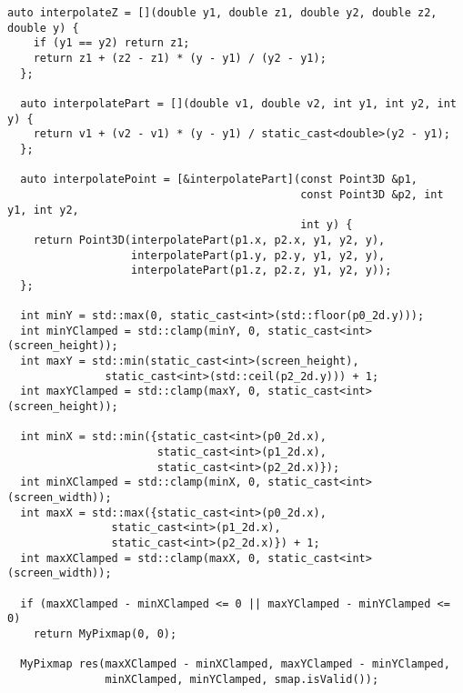 \begin{lstlisting}[caption={Продолжение Растеризация треугольника}, label={lst:render_triangle1}]
  auto interpolateZ = [](double y1, double z1, double y2, double z2, double y) {
    if (y1 == y2) return z1;
    return z1 + (z2 - z1) * (y - y1) / (y2 - y1);
  };

  auto interpolatePart = [](double v1, double v2, int y1, int y2, int y) {
    return v1 + (v2 - v1) * (y - y1) / static_cast<double>(y2 - y1);
  };

  auto interpolatePoint = [&interpolatePart](const Point3D &p1,
                                             const Point3D &p2, int y1, int y2,
                                             int y) {
    return Point3D(interpolatePart(p1.x, p2.x, y1, y2, y),
                   interpolatePart(p1.y, p2.y, y1, y2, y),
                   interpolatePart(p1.z, p2.z, y1, y2, y));
  };

  int minY = std::max(0, static_cast<int>(std::floor(p0_2d.y)));
  int minYClamped = std::clamp(minY, 0, static_cast<int>(screen_height));
  int maxY = std::min(static_cast<int>(screen_height),
               static_cast<int>(std::ceil(p2_2d.y))) + 1; 
  int maxYClamped = std::clamp(maxY, 0, static_cast<int>(screen_height));

  int minX = std::min({static_cast<int>(p0_2d.x),
                       static_cast<int>(p1_2d.x),
                       static_cast<int>(p2_2d.x)});
  int minXClamped = std::clamp(minX, 0, static_cast<int>(screen_width));
  int maxX = std::max({static_cast<int>(p0_2d.x),
                static_cast<int>(p1_2d.x),
                static_cast<int>(p2_2d.x)}) + 1;
  int maxXClamped = std::clamp(maxX, 0, static_cast<int>(screen_width));

  if (maxXClamped - minXClamped <= 0 || maxYClamped - minYClamped <= 0)
    return MyPixmap(0, 0);

  MyPixmap res(maxXClamped - minXClamped, maxYClamped - minYClamped,
               minXClamped, minYClamped, smap.isValid());
\end{lstlisting}

